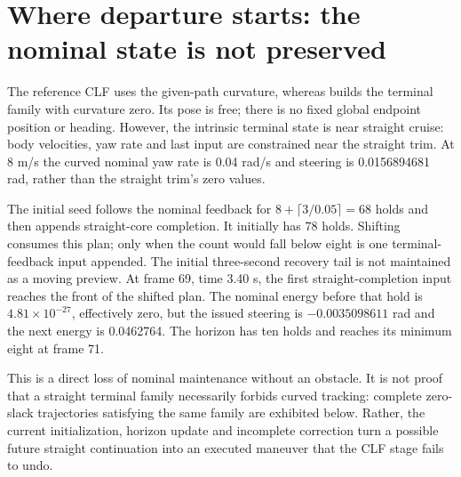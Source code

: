 \documentclass[11pt]{article}
\begin{document}
\section{Where departure starts: the nominal state is not preserved}
The reference CLF uses the given-path curvature, whereas
 builds the terminal family
with curvature zero. Its pose is free; there is no fixed global endpoint
position or heading. However, the intrinsic terminal state is near straight
cruise: body velocities, yaw rate and last input are constrained near the
straight trim. At 8 m/s the curved nominal yaw rate is 0.04 rad/s and steering
is 0.0156894681 rad, rather than the straight trim's zero values.

The initial seed follows the nominal feedback for
$8+\lceil3/0.05\rceil=68$ holds and then appends straight-core completion.
It initially has 78 holds. Shifting consumes this plan; only when the count
would fall below eight is one terminal-feedback input appended. The initial
three-second recovery tail is not maintained as a moving preview.
At frame 69, time 3.40 s, the first straight-completion input reaches the
front of the shifted plan. The nominal energy before that hold is
$4.81\times10^{-27}$, effectively zero, but the issued steering is
$-0.0035098611$ rad and the next energy is 0.0462764. The horizon has ten
holds and reaches its minimum eight at frame 71.

This is a direct loss of nominal maintenance without an obstacle. It is not
proof that a straight terminal family necessarily forbids curved tracking:
complete zero-slack trajectories satisfying the same family are exhibited
below. Rather, the current initialization, horizon update and incomplete
correction turn a possible future straight continuation into an executed
maneuver that the CLF stage fails to undo.
\end{document}
